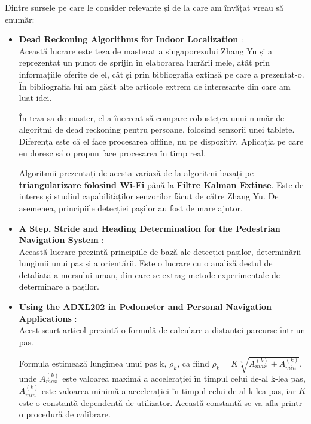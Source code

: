 \documentclass[12pt, a4paper, oneside]{article}
\begin{document}
Dintre sursele pe care le consider relevante și de la care am învățat vreau să enumăr:
 
\begin{itemize}  
\item \textbf{Dead Reckoning Algorithms for Indoor Localization} \cite{ZhangYu}:\\
Această lucrare este teza de masterat a singaporezului Zhang Yu și a reprezentat un punct de sprijin în elaborarea lucrării mele, atât prin informațiile oferite de el, cât și prin bibliografia extinsă pe care a prezentat-o. În bibliografia lui am găsit alte articole extrem de interesante din care am luat idei.

În teza sa de master, el a încercat să compare robustețea unui număr de algoritmi de dead reckoning pentru persoane, folosind senzorii unei tablete. Diferența este că el face procesarea offline, nu pe dispozitiv. Aplicația pe care eu doresc să o propun face procesarea în timp real.

Algoritmii prezentați de acesta variază de la algoritmi bazați pe \textbf{triangularizare folosind Wi-Fi} până la \textbf{Filtre Kalman Extinse}. Este de interes și studiul capabilităților senzorilor făcut de către Zhang Yu. De asemenea, principiile detecției pașilor au fost de mare ajutor.

\item \textbf{A Step, Stride and Heading Determination for the Pedestrian
Navigation System} \cite{StepLengthAndHeadingDetermination}:\\
Această lucrare prezintă principiile de bază ale detecției pașilor, determinării lungimii unui pas și a orientării. Este o lucrare cu o analiză destul de detaliată a mersului uman, din care se extrag metode experimentale de determinare a pașilor.

\item \textbf{Using the ADXL202 in Pedometer and Personal Navigation Applications} \cite{HarveyWeinberg}:\\
Acest scurt articol prezintă o formulă de calculare a distanței parcurse într-un pas.

Formula estimează lungimea unui pas k, $\rho_{k}$, ca fiind $\rho_{k} = K \sqrt[4]{A_{max}^{(k)} + A_{min}^{(k)}}$, unde $A_{max}^{(k)}$ este valoarea maximă a accelerației în timpul celui de-al k-lea pas, $A_{min}^{(k)}$ este valoarea minimă a accelerației în timpul celui de-al k-lea pas, iar $K$ este o constantă dependentă de utilizator. Această constantă se va afla printr-o procedură de calibrare.


\end{itemize}
\end{document}

